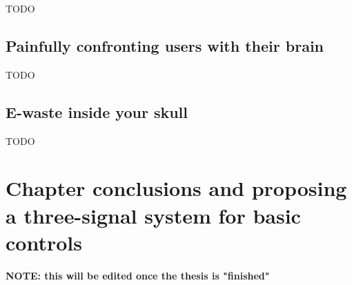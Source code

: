 TODO


\subsection{Painfully confronting users with their brain}
\label{subsec:bci_ethical_confronting}

TODO


\subsection{E-waste inside your skull}
\label{subsec:bci_ethical_e_waste}


TODO


\section{Chapter conclusions and proposing a three-signal system for basic controls}
\label{sec:bci_concolusion_and_proposing_ours}



\textbf{NOTE: this will be edited once the thesis is "finished"}

